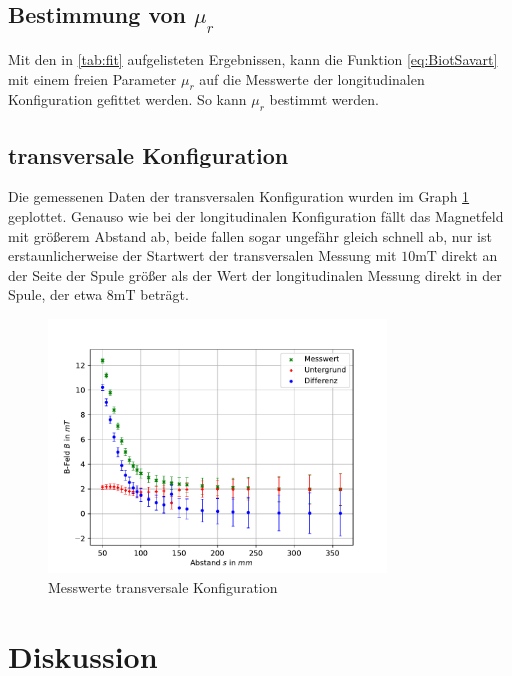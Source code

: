 \documentclass[11pt, a4paper]{article}
\begin{document}
    \subsection{Bestimmung von $\mu_r$}
    Mit den in \ref{tab:fit} aufgelisteten Ergebnissen, kann die Funktion \ref{eq:BiotSavart} mit einem freien Parameter $\mu_r$ auf die Messwerte der longitudinalen Konfiguration gefittet werden. So kann $\mu_r$ bestimmt werden.


    \subsection{transversale Konfiguration}
    Die gemessenen Daten der transversalen Konfiguration wurden im Graph \ref{fig:transmess} geplottet.
    Genauso wie bei der longitudinalen Konfiguration fällt das Magnetfeld mit größerem Abstand ab, beide fallen sogar ungefähr gleich schnell ab, nur ist erstaunlicherweise der Startwert der transversalen Messung mit $10 \si{\milli\tesla}$ direkt an der Seite der Spule größer als der Wert der longitudinalen Messung direkt in der Spule, der etwa $8 \si{\milli\tesla}$ beträgt.
    \begin{figure}[h]
        \centering
        \includegraphics[width=0.8\textwidth]{raw2.pdf}
        \caption{Messwerte transversale Konfiguration}
        \label{fig:transmess}
    \end{figure}


    \section{Diskussion}

    
    
\end{document}
